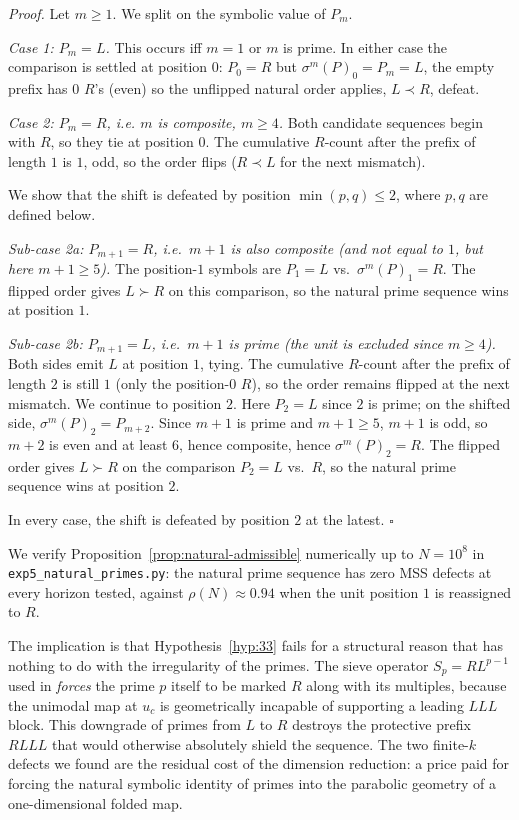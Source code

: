 \documentclass[cupthm,crop,info]{CUP-JNL-ETS}
\theoremstyle{cupplain}
\theoremstyle{cupdefinition}
\theoremstyle{cupremark}
\providecommand{\qed}{\hfill\(\square\)}
\newenvironment{proof}{\par\noindent\textit{Proof.}\quad}{\qed\par\medskip}
\numberwithin{equation}{section}
\begin{document}
\begin{proof}
Let $m \geq 1$. We split on the symbolic value of $P_m$.

\emph{Case 1: $P_m = L$.} This occurs iff $m = 1$ or $m$ is prime. In
either case the comparison is settled at position $0$: $P_0 = R$ but
$\sigma^m(P)_0 = P_m = L$, the empty prefix has $0$ $R$'s (even) so the
unflipped natural order applies, $L \prec R$, defeat.

\emph{Case 2: $P_m = R$, i.e. $m$ is composite, $m \geq 4$.} Both
candidate sequences begin with $R$, so they tie at position $0$. The
cumulative $R$-count after the prefix of length $1$ is $1$, odd, so the
order flips ($R \prec L$ for the next mismatch).

We show that the shift is defeated by position $\min(p, q) \leq 2$,
where $p, q$ are defined below.

\emph{Sub-case 2a: $P_{m+1} = R$, i.e.\ $m + 1$ is also composite (and
not equal to $1$, but here $m + 1 \geq 5$).} The position-$1$ symbols
are $P_1 = L$ vs.\ $\sigma^m(P)_1 = R$. The flipped order gives
$L \succ R$ on this comparison, so the natural prime sequence wins at
position $1$.

\emph{Sub-case 2b: $P_{m+1} = L$, i.e.\ $m + 1$ is prime (the unit is
excluded since $m \geq 4$).} Both sides emit $L$ at position $1$, tying.
The cumulative $R$-count after the prefix of length $2$ is still $1$
(only the position-$0$ $R$), so the order remains flipped at the next
mismatch. We continue to position $2$. Here $P_2 = L$ since $2$ is
prime; on the shifted side, $\sigma^m(P)_2 = P_{m+2}$. Since $m + 1$ is
prime and $m + 1 \geq 5$, $m + 1$ is odd, so $m + 2$ is even and at
least $6$, hence composite, hence $\sigma^m(P)_2 = R$. The flipped
order gives $L \succ R$ on the comparison $P_2 = L$ vs.\ $R$, so the
natural prime sequence wins at position $2$.

In every case, the shift is defeated by position $2$ at the latest.
\end{proof}

We verify Proposition~\ref{prop:natural-admissible} numerically up to
$N = 10^8$ in \texttt{exp5\_natural\_primes.py}: the natural prime
sequence has zero MSS defects at every horizon tested, against
$\rho(N) \approx 0.94$ when the unit position $1$ is reassigned to $R$.

The implication is that Hypothesis~\ref{hyp:33} fails for a structural
reason that has nothing to do with the irregularity of the primes. The
sieve operator $S_p = R L^{p-1}$ used in \cite{wang2026emergence}
\emph{forces} the prime $p$ itself to be marked $R$ along with its
multiples, because the unimodal map at $u_c$ is geometrically incapable
of supporting a leading $L L L$ block. This downgrade of primes from
$L$ to $R$ destroys the protective prefix $R L L L$ that would otherwise
absolutely shield the sequence. The two finite-$k$ defects we found are
the residual cost of the dimension reduction: a price paid for forcing
the natural symbolic identity of primes into the parabolic geometry of
a one-dimensional folded map.
\end{document}
